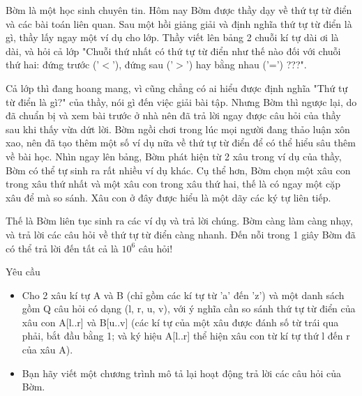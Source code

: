 Bờm là một học sinh chuyên tin. Hôm nay Bờm được thầy dạy về thứ tự từ điển và các bài toán liên quan. Sau một hồi giảng giải và định nghĩa thứ tự từ điển là gì, thầy lấy ngay một ví dụ cho lớp. Thầy viết lên bảng 2 chuỗi kí tự dài ơi là dài, và hỏi cả lớp "Chuỗi thứ nhất có thứ tự từ điển như thế nào đối với chuỗi thứ hai: đứng trước ('$<$'), đứng sau ('$>$') hay bằng nhau ('=') ???".  

   Cả lớp thì đang hoang mang, vì cũng chẳng có ai hiểu được định nghĩa "Thứ tự từ điển là gì?" của thầy, nói gì đến việc giải bài tập. Nhưng Bờm thì ngược lại, do đã chuẩn bị và xem bài trước ở nhà nên đã trả lời ngay được câu hỏi của thầy sau khi thấy vừa dứt lời. Bờm ngồi chơi trong lúc mọi người đang thảo luận xôn xao, nên đã tạo thêm một số ví dụ nữa về thứ tự từ điển để có thể hiểu sâu thêm về bài học. Nhìn ngay lên bảng, Bờm phát hiện từ 2 xâu trong ví dụ của thầy, Bờm có thể tự sinh ra rất nhiều ví dụ khác. Cụ thể hơn, Bờm chọn một xâu con trong xâu thứ nhất và một xâu con trong xâu thứ hai, thế là có ngay một cặp xâu để mà so sánh. Xâu con ở đây được hiểu là một dãy các ký tự liên tiếp.  

   Thế là Bờm liên tục sinh ra các ví dụ và trả lời chúng. Bờm càng làm càng nhạy, và trả lời các câu hỏi về thứ tự từ điển càng nhanh. Đến nỗi trong 1 giây Bờm đã có thể trả lời đến tất cả là $10^{6}$   câu hỏi!  

Yêu cầu
\begin{itemize}
	\item     Cho 2 xâu kí tự A và B (chỉ gồm các kí tự từ 'a' đến 'z') và một danh sách gồm Q câu hỏi có dạng (l, r, u, v), với ý nghĩa cần so sánh thứ tự từ điển của xâu con A[l..r] và B[u..v] (các kí tự của một xâu được đánh số từ trái qua phải, bắt đầu bằng 1; và ký hiệu A[l..r] thể hiện xâu con từ kí tự thứ l đến r của xâu A).   
	\item     Bạn hãy viết một chương trình mô tả lại hoạt động trả lời các câu hỏi của Bờm.   
\end{itemize}